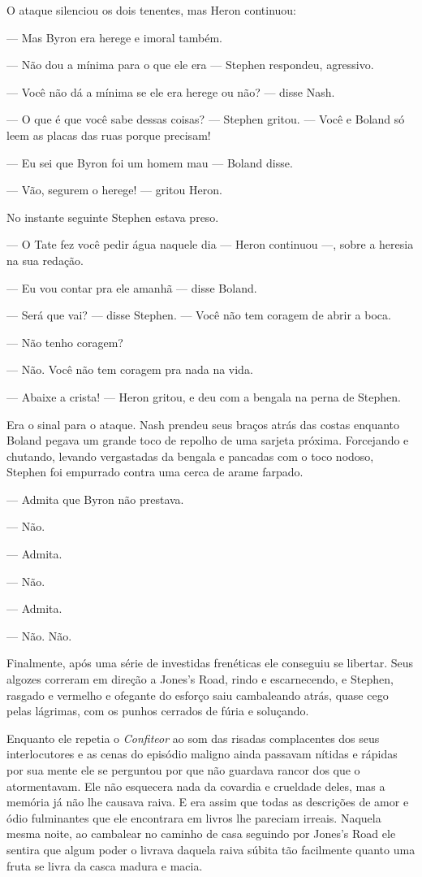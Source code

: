 O ataque silenciou os dois tenentes, mas Heron continuou:

 --- Mas Byron era herege e imoral também.

 --- Não dou a mínima para o que ele era --- Stephen respondeu, agressivo.

 --- Você não dá a mínima se ele era herege ou não? --- disse Nash.

 --- O que é que você sabe dessas coisas? --- Stephen gritou. --- Você e Boland só
leem as placas das ruas porque precisam!

 --- Eu sei que Byron foi um homem mau --- Boland disse.

 --- Vão, segurem o herege! --- gritou Heron.

No instante seguinte Stephen estava preso.

 --- O Tate fez você pedir água naquele dia --- Heron continuou ---, sobre a
heresia na sua redação.

 --- Eu vou contar pra ele amanhã --- disse Boland.

 --- Será que vai? --- disse Stephen. --- Você não tem coragem de abrir a boca.

 --- Não tenho coragem?

 --- Não. Você não tem coragem pra nada na vida.

 --- Abaixe a crista! --- Heron gritou, e deu com a bengala na perna de
Stephen.

Era o sinal para o ataque. Nash prendeu seus braços atrás das costas
enquanto Boland pegava um grande toco de repolho de uma sarjeta
próxima. Forcejando e chutando, levando vergastadas da bengala e
pancadas com o toco nodoso, Stephen foi empurrado contra uma cerca de
arame farpado.

 --- Admita que Byron não prestava.

 --- Não.

 --- Admita.

 --- Não.

 --- Admita.

 --- Não. Não.

Finalmente, após uma série de investidas frenéticas ele conseguiu se
libertar. Seus algozes correram em direção a Jones’s
Road, rindo e escarnecendo, e Stephen, rasgado e vermelho e ofegante do
esforço saiu cambaleando atrás, quase cego pelas lágrimas, com os
punhos cerrados de fúria e soluçando.

Enquanto ele repetia o \textit{Confiteor} ao som das risadas
complacentes dos seus interlocutores e as cenas do episódio maligno
ainda passavam nítidas e rápidas por sua mente ele se perguntou por que
não guardava rancor dos que o atormentavam. Ele não esquecera nada da
covardia e crueldade deles, mas a memória já não lhe causava raiva. E
era assim que todas as descrições de amor e ódio fulminantes que ele
encontrara em livros lhe pareciam irreais. Naquela mesma noite, ao
cambalear no caminho de casa seguindo por Jones’s Road
ele sentira que algum poder o livrava daquela raiva súbita tão
facilmente quanto uma fruta se livra da casca madura e macia.

